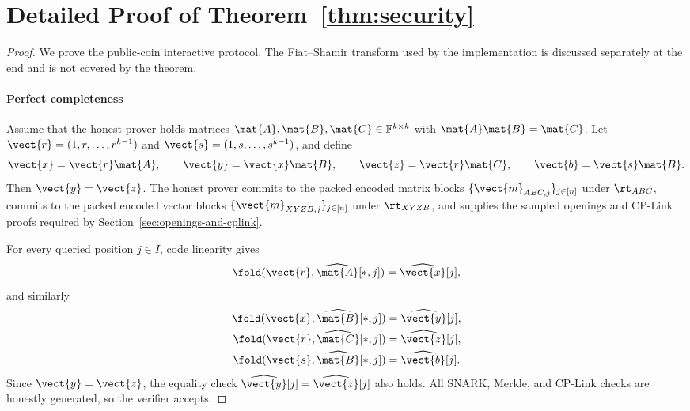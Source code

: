 \fi
\section{Detailed Proof of Theorem~\ref{thm:security}}
\label{app:security-proof}

\begin{proof}
We prove the public-coin interactive protocol. The Fiat--Shamir transform used
by the implementation is discussed separately at the end and is not covered by
the theorem.

\paragraph{Perfect completeness}
Assume that the honest prover holds matrices
\(\mat{A},\mat{B},\mat{C}\in\mathbb{F}^{k\times k}\) with
\(\mat{A}\mat{B}=\mat{C}\).  Let
\(\vect{r}=(1,r,\ldots,r^{k-1})\) and
\(\vect{s}=(1,s,\ldots,s^{k-1})\), and define
\[
  \vect{x}=\vect{r}\mat{A},
  \qquad
  \vect{y}=\vect{x}\mat{B},
  \qquad
  \vect{z}=\vect{r}\mat{C},
  \qquad
  \vect{b}=\vect{s}\mat{B}.
\]
Then \(\vect{y}=\vect{z}\).  The honest prover commits to the packed encoded
matrix blocks \(\{\vect{m}_{ABC,j}\}_{j\in[n]}\) under \(\rt_{ABC}\), commits
to the packed encoded vector blocks \(\{\vect{m}_{XYZB,j}\}_{j\in[n]}\) under
\(\rt_{XYZB}\), and supplies the sampled openings and CP-Link proofs required
by Section~\ref{sec:openings-and-cplink}.

For every queried position \(j\in I\), code linearity gives
\[
  \fold(\vect{r},\widehat{\mat{A}}[*,j])
  =
  \widehat{\vect{x}}[j],
\]
and similarly
\[
\begin{aligned}
  \fold(\vect{x},\widehat{\mat{B}}[*,j])
  &= \widehat{\vect{y}}[j],\\
  \fold(\vect{r},\widehat{\mat{C}}[*,j])
  &= \widehat{\vect{z}}[j],\\
  \fold(\vect{s},\widehat{\mat{B}}[*,j])
  &= \widehat{\vect{b}}[j].
\end{aligned}
\]
Since \(\vect{y}=\vect{z}\), the equality check
\(\widehat{\vect{y}}[j]=\widehat{\vect{z}}[j]\) also holds.  All SNARK,
Merkle, and CP-Link checks are honestly generated, so the verifier accepts.


\end{proof}
